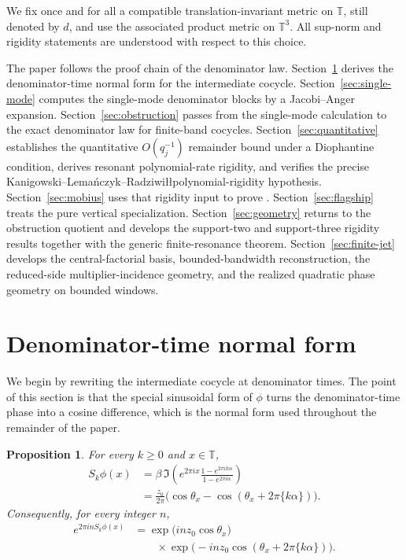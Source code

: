 \documentclass[11pt,reqno]{amsart}
\newtheorem{proposition}[theorem]{Proposition}
\theoremstyle{definition}
\newcommand{\T}{\mathbb{T}}
\newcommand{\e}[1]{e^{2\pi i #1}}
\newcommand{\qj}{q_j}
\begin{document}
We fix once and for all a compatible translation-invariant metric on $\T$, still denoted by
$d$, and use the associated product metric on $\T^3$. All sup-norm and rigidity statements are
understood with respect to this choice.

The paper follows the proof chain of the denominator law. Section~\ref{sec:normal-form}
derives the denominator-time normal form for the intermediate cocycle. Section~\ref{sec:single-mode}
computes the single-mode denominator blocks by a Jacobi--Anger expansion. Section~\ref{sec:obstruction}
passes from the single-mode calculation to the exact denominator law for finite-band cocycles.
Section~\ref{sec:quantitative} establishes the quantitative $O(\qj^{-1})$ remainder bound under a
Diophantine condition, derives resonant polynomial-rate rigidity, and verifies the precise
Kanigowski--Lema\'nczyk--Radziwi\l\l polynomial-rigidity hypothesis. Section~\ref{sec:mobius}
uses that rigidity input to prove . Section~\ref{sec:flagship}
treats the pure vertical specialization. Section~\ref{sec:geometry} returns to the obstruction
quotient and develops the support-two and support-three rigidity results together with the
generic finite-resonance theorem. Section~\ref{sec:finite-jet} develops the central-factorial
basis, bounded-bandwidth reconstruction, the reduced-side multiplier-incidence geometry, and the
realized quadratic phase geometry on bounded windows.

\section{Denominator-time normal form}\label{sec:normal-form}

We begin by rewriting the intermediate cocycle at denominator times. The point of this section
is that the special sinusoidal form of $\phi$ turns the denominator-time phase into a cosine
difference, which is the normal form used throughout the remainder of the paper.

\begin{proposition}\label{prop:normal-form}
For every $k\ge 0$ and $x\in\T$,
\[
\begin{aligned}
S_k\phi(x)
&=
\beta\,\Im\!\left(\e{x}\frac{1-\e{k\alpha}}{1-\e{\alpha}}\right)\\
&=
\frac{z_0}{2\pi}\bigl(\cos \theta_x-\cos(\theta_x+2\pi\{k\alpha\})\bigr).
\end{aligned}
\]
Consequently, for every integer $n$,
\[
\begin{aligned}
\e{n S_k\phi(x)}
&=
\exp\!\bigl(i n z_0\cos \theta_x\bigr)\\
&\qquad \times \exp\!\bigl(-i n z_0\cos(\theta_x+2\pi\{k\alpha\})\bigr).
\end{aligned}
\]
\end{proposition}
\end{document}
